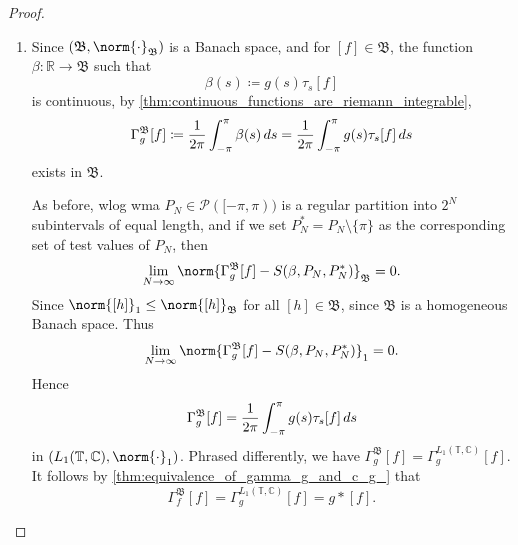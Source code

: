 \documentclass[notoc,notitlepage]{tufte-book}
\begin{document}
\begin{proof}
  \begin{enumerate}
    \item Since $(\mathfrak{B}, \norm{\cdot}_{\mathfrak{B}})$ is a Banach space,
      and for $[f] \in \mathfrak{B}$, the function
      $\beta : \mathbb{R} \to \mathfrak{B}$ such that
      \begin{equation*}
        \beta(s) \coloneqq g(s) \tau_s[f]
      \end{equation*}
      is continuous, by \cref{thm:continuous_functions_are_riemann_integrable},
      \begin{equation*}
        \Gamma_g^{\mathfrak{B}}[f]
        \coloneqq \frac{1}{2\pi} \int_{-\pi}^{\pi} \beta(s) \mathop{}\!d{s}
        = \frac{1}{2\pi} \int_{-\pi}^{\pi} g(s) \tau_s[f] \mathop{}\!d{s}
      \end{equation*}
      exists in $\mathfrak{B}$.

      As before, wlog wma $P_N \in \mathcal{P}([-\pi, \pi))$ is a regular
      partition into $2^N$ subintervals of equal length,
      and if we set $P_N^* = P_N \setminus \{ \pi \}$ as the corresponding set
      of test values of $P_N$, then
      \begin{equation*}
        \lim_{N \to \infty}
        \norm{ \Gamma_g^{\mathfrak{B}}[f] - S(\beta,P_N,P_N^*) }_{\mathfrak{B}}
        = 0.
      \end{equation*}
      Since $\norm{[h]}_1 \leq \norm{[h]}_{\mathfrak{B}}$ for all
      $[h] \in \mathfrak{B}$, since $\mathfrak{B}$ is a homogeneous Banach
      space.
      Thus
      \begin{equation*}
        \lim_{N \to \infty} \norm{\Gamma_g^{\mathfrak{B}}[f] - S(\beta,P_N,
        P_N^*) }_1 = 0.
      \end{equation*}
      Hence
      \begin{equation*}
        \Gamma_g^{\mathfrak{B}}[f]
        = \frac{1}{2\pi} \int_{-\pi}^{\pi} g(s)\tau_s[f] \mathop{}\!d{s}
      \end{equation*}
      in $(L_1(\mathbb{T}, \mathbb{C}), \norm{\cdot}_1)$.
      Phrased differently, we have $\Gamma_g^{\mathfrak{B}}[f] =
      \Gamma_g^{L_1(\mathbb{T}, \mathbb{C})}[f]$.
      It follows by
      \cref{thm:equivalence_of_gamma_g_and_c_g_}
      that
      \begin{equation*}
        \Gamma_f^{\mathfrak{B}}[f] = \Gamma_g^{L_1(\mathbb{T}, \mathbb{C})}[f]
        = g * [f].
      \end{equation*}


\end{enumerate}
\end{proof}
\end{document}
